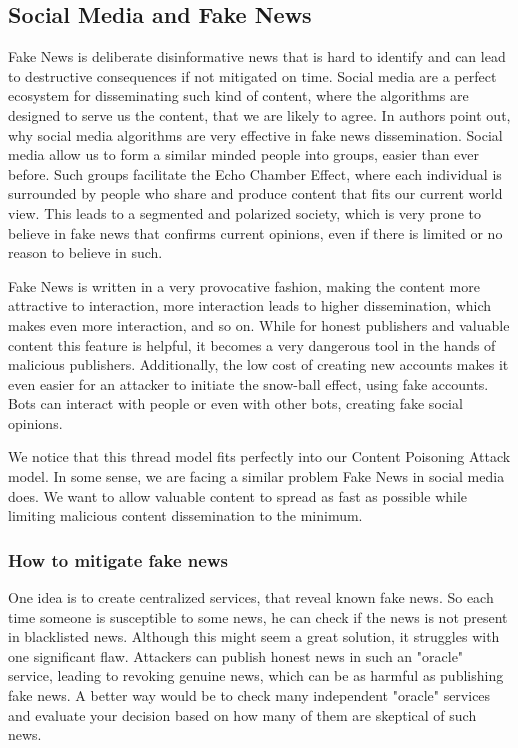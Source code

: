 \documentclass[nostrict]{szablonPG}
\begin{document}
\subsection{Social Media and Fake News}
Fake News is deliberate disinformative news that is hard to identify and can lead to destructive consequences if not mitigated on time. Social media are a perfect ecosystem for disseminating such kind of content, where the algorithms are designed to serve us the content, that we are likely to agree. In \cite{zhou2018fake} authors point out, why social media algorithms are very effective in fake news dissemination. Social media allow us to form a similar minded people into groups, easier than ever before. Such groups facilitate the Echo Chamber Effect, where each individual is surrounded by people who share and produce content that fits our current world view. This leads to a segmented and polarized society, which is very prone to believe in fake news that confirms current opinions, even if there is limited or no reason to believe in such. 

Fake News is written in a very provocative fashion, making the content more attractive to interaction, more interaction leads to higher dissemination, which makes even more interaction, and so on. While for honest publishers and valuable content this feature is helpful, it becomes a very dangerous tool in the hands of malicious publishers. Additionally, the low cost of creating new accounts makes it even easier for an attacker to initiate the snow-ball effect, using fake accounts. Bots can interact with people or even with other bots, creating fake social opinions.  

We notice that this thread model fits perfectly into our Content Poisoning Attack model. In some sense, we are facing a similar problem Fake News in social media does. We want to allow valuable content to spread as fast as possible while limiting malicious content dissemination to the minimum.


\subsubsection{How to mitigate fake news}
\label{mitigating-certification-services}
One idea is to create centralized services, that reveal known fake news. So each time someone is susceptible to some news, he can check if the news is not present in blacklisted news. Although this might seem a great solution, it struggles with one significant flaw. Attackers can publish honest news in such an "oracle" service, leading to revoking genuine news, which can be as harmful as publishing fake news. A better way would be to check many independent "oracle" services and evaluate your decision based on how many of them are skeptical of such news.
\end{document}
